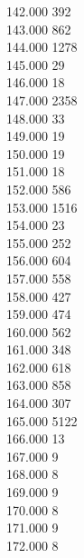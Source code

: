 { 142.000	392 \\
 143.000	862 \\
 144.000	1278 \\
 145.000	29 \\
 146.000	18 \\
 147.000	2358 \\
 148.000	33 \\
 149.000	19 \\
 150.000	19 \\
 151.000	18 \\
 152.000	586 \\
 153.000	1516 \\
 154.000	23 \\
 155.000	252 \\
 156.000	604 \\
 157.000	558 \\
 158.000	427 \\
 159.000	474 \\
 160.000	562 \\
 161.000	348 \\
 162.000	618 \\
 163.000	858 \\
 164.000	307 \\
 165.000	5122 \\
 166.000	13 \\
 167.000	9 \\
 168.000	8 \\
 169.000	9 \\
 170.000	8 \\
 171.000	9 \\
 172.000	8 \\
}
